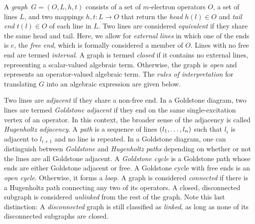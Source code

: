 \documentclass[11pt]{article}
\numberwithin{equation}{section}
\begin{document}
\begin{dfn}\label{dfn:graph}
A \textit{graph}\footnotemark\
$G=(O,L,h,t)$ consists of a set of $m$-electron operators $O$, a set of lines $L$, and two mappings $h,t:L\rightarrow O$ that return the \textit{head} $h(l)\in O$ and \textit{tail end} $t(l)\in O$ of each line in $L$.
Two lines are considered \textit{equivalent} if they share the same head and tail.
Here, we allow for \textit{external lines} in which one of the ends is $e$, the \textit{free end}, which is formally considered a member of $O$.
Lines with no free end are termed \textit{internal}.
A graph is termed \textit{closed} if it contains no external lines, representing a scalar-valued algebraic term.
Otherwise, the graph is \textit{open} and represents an operator-valued algebraic term.
The \textit{rules of interpretation} for translating $G$ into an algebraic expression are given below.
\end{dfn}


\begin{dfn}
Two lines are \textit{adjacent} if they share a non-free end.
In a Goldstone diagram, two lines are termed \textit{Goldstone adjacent} if they end on the same single-excitation vertex of an operator.
In this context, the broader sense of the adjacency is called \textit{Hugenholtz adjacency}.
A \textit{path} is a sequence of lines $(l_1,\ldots,l_n)$ such that $l_i$ is adjacent to $l_{i+1}$ and no line is repeated.
In a Goldstone diagram, one can distinguish between \textit{Goldstone} and \textit{Hugenholtz paths} depending on whether or not the lines are all Goldstone adjacent.
A \textit{Goldstone cycle} is a Goldstone path whose ends are either Goldstone adjacent or free.
A Goldstone cycle with free ends is an \textit{open cycle}.
Otherwise, it forms a \textit{loop}.
A graph is considered \textit{connected} if there is a Hugenholtz path connecting any two of its operators.
A closed, disconnected subgraph is considered \textit{unlinked} from the rest of the graph.
Note this last distinction: A \textit{disconnected} graph is still classified as \textit{linked}, as long as none of its disconnected subgraphs are closed.
\end{dfn}
\end{document}
